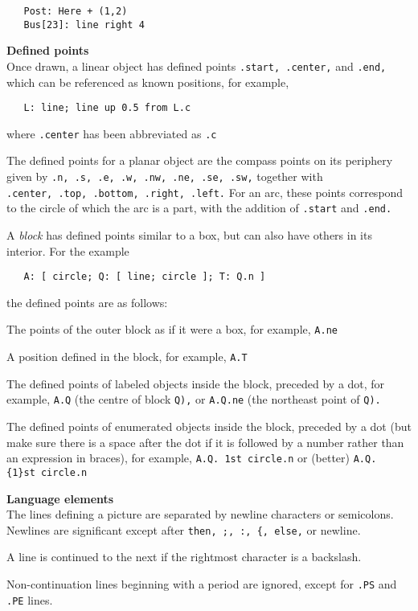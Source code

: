 {\tt \ \ \ Post:\ Here\ +\ (1,2)}
\\\hbox{}\hskip-1pt
{\tt \ \ \ Bus[23]:\ line\ right\ 4}
\par\hskip-2pc{\bf Defined points}\\
Once drawn, a linear object has defined points
{\tt .start,\ .center,}
and
{\tt .end,}
which can be referenced as known positions, for example,

{\tt \ \ \ L:\ line;\ line\ up\ 0.5\ from\ L.c}

where
{\tt .center}
has been abbreviated as
{\tt .c}

The defined points for a planar object are the compass points
on its periphery given by
{\tt .n,\ .s,\ .e,\ .w,\ .nw,\ .ne,\ .se,\ .sw,}
together with
{\tt .center,\ .top,\ .bottom,\ .right,\ .left.}
For an arc, these points correspond to the circle of which the arc is a
part, with the addition of
{\tt .start}
and
{\tt .end.}

A
{\it block}
has defined points similar to a box, but can also have others in its
interior.
For the example

{\tt \ \ \ A:\ [\ circle;\ Q:\ [\ line;\ circle\ ];\ T:\ Q.n\ ]}

the defined points are as follows:

   The points of the outer block as if it were a box, for
   example,
{\tt A.ne}

   A position defined in the block, for example,
{\tt A.T}

   The defined points of labeled objects inside the block,
   preceded by a dot, for example,
{\tt A.Q}
(the centre of
   block
{\tt Q),}
or
{\tt A.Q.ne}
(the northeast point of
{\tt Q).}

   The defined points of enumerated objects inside the
   block, preceded by a dot (but make sure there is a space
   after the dot if it is followed by a number rather than
   an expression in braces), for example,
{\tt A.Q.\ 1st\ circle.n}
   or (better)
{\tt A.Q.\{1\}st\ circle.n}
\par\hskip-2pc{\bf Language elements}\\
The lines defining a picture are separated by newline characters
or semicolons.
Newlines are significant except after
{\tt then,\ ;,\ :,\ \{,\ else,}
or newline.

A line is continued to the next if the rightmost character is a backslash.

Non-continuation lines beginning with a period are ignored, except for
{\tt .PS}
and
{\tt .PE}
lines.


